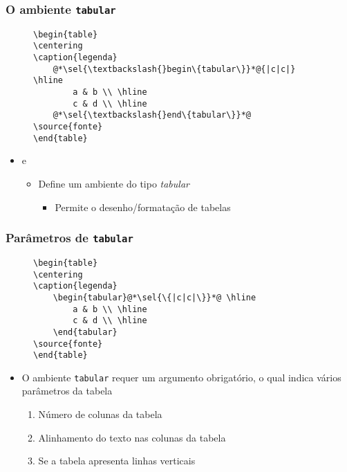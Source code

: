 \begin{frame}[fragile] \frametitle{O ambiente \texttt{tabular}}
\begin{figure}[!t]
\begin{lstlisting}
\begin{table}
\centering
\caption{legenda}
	@*\sel{\textbackslash{}begin\{tabular\}}*@{|c|c|} \hline
		a & b \\ \hline
		c & d \\ \hline
	@*\sel{\textbackslash{}end\{tabular\}}*@
\source{fonte}
\end{table}
\end{lstlisting}
\end{figure}

\begin{itemize}
	\item {} e 
	\begin{itemize}
		\item Define um ambiente do tipo \textit{tabular}
		\begin{itemize}
			\item Permite o desenho/formatação de tabelas
		\end{itemize}
	\end{itemize}
\end{itemize}
\end{frame}

\begin{frame}[fragile] \frametitle{Parâmetros de \texttt{tabular}}
\begin{figure}[!t]
\begin{lstlisting}
\begin{table}
\centering
\caption{legenda}
	\begin{tabular}@*\sel{\{|c|c|\}}*@ \hline
		a & b \\ \hline
		c & d \\ \hline
	\end{tabular}
\source{fonte}
\end{table}
\end{lstlisting}
\end{figure}

\begin{itemize}
	\item O ambiente \texttt{tabular} requer um argumento obrigatório, o qual indica vários parâmetros da tabela
	\begin{enumerate}
		\item Número de colunas da tabela
		\item Alinhamento do texto nas colunas da tabela
		\item Se a tabela apresenta linhas verticais
	\end{enumerate}
\end{itemize}
\end{frame}

